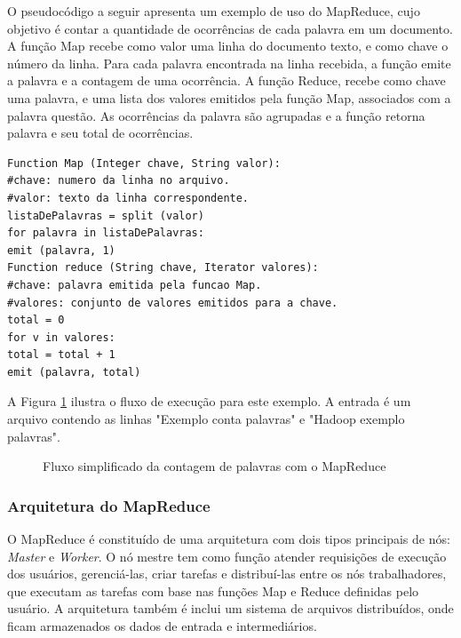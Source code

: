 O pseudocódigo a seguir apresenta um exemplo de uso do MapReduce, cujo objetivo é contar a quantidade de ocorrências de cada palavra em um documento. A função Map recebe como valor uma linha do documento texto, e como chave o número da linha. Para cada palavra encontrada na linha recebida, a função emite a palavra e a contagem de uma ocorrência. A função Reduce, recebe como chave uma palavra, e uma lista dos valores emitidos pela função Map, associados com a palavra questão. As ocorrências da palavra são agrupadas e a função retorna palavra e seu total de ocorrências.

\begin{lstlisting}[label=some-code,caption=Pseudocódigo do exemplo de contagem de palavras com o MapReduce]
Function Map (Integer chave, String valor):
#chave: numero da linha no arquivo.
#valor: texto da linha correspondente.
listaDePalavras = split (valor)
for palavra in listaDePalavras:
emit (palavra, 1)
Function reduce (String chave, Iterator valores):
#chave: palavra emitida pela funcao Map.
#valores: conjunto de valores emitidos para a chave.
total = 0
for v in valores:
total = total + 1
emit (palavra, total)
\end{lstlisting}

A Figura \ref{fig:Mapreduceexemplo} ilustra o fluxo de execução para este exemplo. A entrada é um arquivo contendo as linhas "Exemplo conta palavras" e "Hadoop exemplo palavras".

\begin{figure}[htb]
\centering
\caption{Fluxo simplificado da contagem de palavras com o MapReduce}
\label{fig:Mapreduceexemplo}
\end{figure}

\subsubsection{Arquitetura do MapReduce}
O MapReduce é constituído de uma arquitetura com dois tipos principais de nós: \textit{Master} e \textit{Worker}. O nó mestre tem como função atender requisições de execução dos usuários, gerenciá-las, criar tarefas e distribuí-las entre os nós trabalhadores, que executam as tarefas com base nas funções Map e Reduce definidas pelo usuário.
A arquitetura também é inclui um sistema de arquivos distribuídos, onde ficam armazenados os dados de entrada e intermediários.


